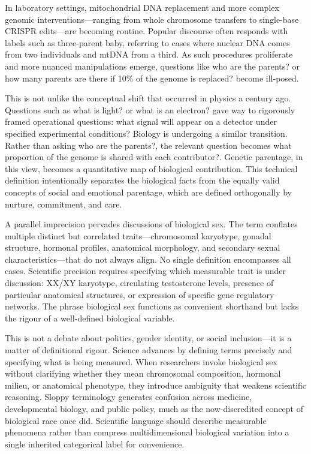 \begin{commentary}
In laboratory settings, mitochondrial DNA replacement and more complex genomic interventions—ranging from whole chromosome transfers to single-base CRISPR edits—are becoming routine. Popular discourse often responds with labels such as \QSOpen{}three-parent baby,\QSClose{} referring to cases where nuclear DNA comes from two individuals and mtDNA from a third. As such procedures proliferate and more nuanced manipulations emerge, questions like \QSOpen{}who are the parents?\QSClose{} or \QSOpen{}how many parents are there if 10\% of the genome is replaced?\QSClose{} become ill-posed.

This is not unlike the conceptual shift that occurred in physics a century ago. Questions such as \QSOpen{}what is light?\QSClose{} or \QSOpen{}what is an electron?\QSClose{} gave way to rigorously framed operational questions: \QSOpen{}what signal will appear on a detector under specified experimental conditions?\QSClose{} Biology is undergoing a similar transition. Rather than asking \QSOpen{}who are the parents?\QSClose{}, the relevant question becomes \QSOpen{}what proportion of the genome is shared with each contributor?\QSClose{}. Genetic parentage, in this view, becomes a quantitative map of biological contribution. This technical definition intentionally separates the biological facts from the equally valid concepts of social and emotional parentage, which are defined orthogonally by nurture, commitment, and care.

A parallel imprecision pervades discussions of \QSOpen{}biological sex.\QSClose{} The term conflates multiple distinct but correlated traits—chromosomal karyotype, gonadal structure, hormonal profiles, anatomical morphology, and secondary sexual characteristics—that do not always align. No single definition encompasses all cases. Scientific precision requires specifying which measurable trait is under discussion: XX/XY karyotype, circulating testosterone levels, presence of particular anatomical structures, or expression of specific gene regulatory networks. The phrase \QSOpen{}biological sex\QSClose{} functions as convenient shorthand but lacks the rigour of a well-defined biological variable.

This is not a debate about politics, gender identity, or social inclusion—it is a matter of definitional rigour. Science advances by defining terms precisely and specifying what is being measured. When researchers invoke \QSOpen{}biological sex\QSClose{} without clarifying whether they mean chromosomal composition, hormonal milieu, or anatomical phenotype, they introduce ambiguity that weakens scientific reasoning. Sloppy terminology generates confusion across medicine, developmental biology, and public policy, much as the now-discredited concept of \QSOpen{}biological race\QSClose{} once did. Scientific language should describe measurable phenomena rather than compress multidimensional biological variation into a single inherited categorical label for convenience.

\end{commentary}

